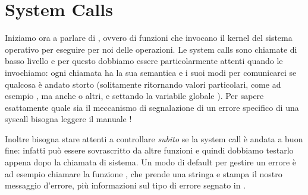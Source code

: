 \section{System Calls}
Iniziamo ora a parlare di , ovvero di funzioni che invocano il kernel del sistema operativo per eseguire per noi delle operazioni. 
Le system calls sono chiamate di basso livello e per questo dobbiamo essere particolarmente attenti quando le invochiamo: ogni chiamata ha la sua semantica e i suoi modi per comunicarci se qualcosa è andato storto (solitamente ritornando valori particolari, come ad esempio , ma anche  o altri, e settando la variabile globale ). 
Per sapere esattamente quale sia il meccanismo di segnalazione di un errore specifico di una syscall bisogna leggere il manuale !

Inoltre bisogna stare attenti a controllare \emph{subito} se la system call è andata a buon fine: infatti  può essere sovrascritto da altre funzioni e quindi dobbiamo testarlo appena dopo la chiamata di sistema. Un modo di default per gestire un errore è ad esempio chiamare la funzione , che prende una stringa e stampa il nostro messaggio d'errore, più informazioni sul tipo di errore segnato in .